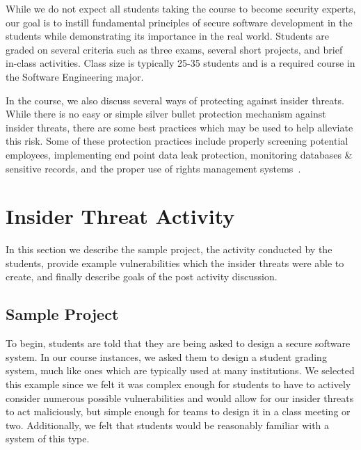 \documentclass[conference]{IEEEtran}
\begin{document}
While we do not expect all students taking the course to become security experts, our goal is to instill fundamental principles of secure software development in the students while demonstrating its importance in the real world. Students are graded on several criteria such as three exams, several short projects, and brief in-class activities. Class size is typically 25-35 students and is a required course in the Software Engineering major.

In the course, we also discuss several ways of protecting against insider threats. While there is no easy or simple silver bullet protection mechanism against insider threats, there are some best practices which may be used to help alleviate this risk. Some of these protection practices include properly screening potential employees, implementing end point data leak protection, monitoring databases \& sensitive records, and the proper use of rights management systems~\cite{Insiderthreat_protection_url}.



\section{Insider Threat Activity}
\label{sec: activity}

In this section we describe the sample project, the activity conducted by the students, provide example vulnerabilities which the insider threats were able to create, and finally describe goals of the post activity discussion.

\subsection{Sample Project}

To begin, students are told that they are being asked to design a secure software system. In our course instances, we asked them to design a student grading system, much like ones which are typically used at many institutions. We selected this example since we felt it was complex enough for students to have to actively consider numerous possible vulnerabilities and would allow for our insider threats to act maliciously, but simple enough for teams to design it in a class meeting or two. Additionally, we felt that students would be reasonably familiar with a system of this type.
\end{document}
